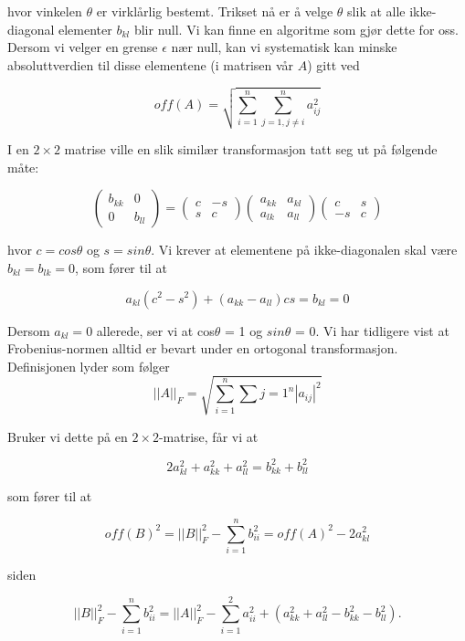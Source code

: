 \documentclass{article}
\begin{document}
hvor vinkelen $\theta$ er virklårlig bestemt. Trikset nå er å velge $\theta$ slik at alle ikke-diagonal elementer $b_{kl}$ blir null. Vi kan finne en algoritme som gjør dette for oss. Dersom vi velger en grense $\epsilon$ nær null, kan vi systematisk kan minske absoluttverdien til disse elementene (i matrisen vår $A$) gitt ved

\[off(A) = \sqrt{\sum_{i=1}^n \sum_{j=1, j\neq i}^n a_{ij}^2 } \]

I en $2 \times 2$ matrise ville en slik similær transformasjon tatt seg ut på følgende måte: 

\[\begin{pmatrix} 
b_{kk} &0 \\ 
0& b_{ll} \end{pmatrix} =
 \begin{pmatrix} 
 c & -s\\ 
 s & c \end{pmatrix}
 \begin{pmatrix} 
 a_{kk} & a_{kl}\\
  a_{lk}& a_{ll} \end{pmatrix}
  \begin{pmatrix} 
  c & s\\ 
  -s &c \end{pmatrix}\]

hvor $c = cos\theta$ og $s = sin\theta$. Vi krever at elementene på ikke-diagonalen skal være $b_{kl} = b_{lk} = 0$, som fører til at

\[a_{kl}(c^2 - s^2) + (a_{kk} - a_{ll})cs = b_{kl} = 0 \]

Dersom $a_{kl} = 0$ allerede, ser vi at cos$\theta$ = 1 og $sin\theta$ = 0. Vi har tidligere vist at Frobenius-normen alltid er bevart under en ortogonal transformasjon. Definisjonen lyder som følger
\begin{equation}
|| A ||_F = \sqrt{\sum_{i=1}^n \sum{j=1}^n |a_{ij}|^2 }
\end{equation}

Bruker vi dette på en $2\times 2$-matrise, får vi at 

\[2a_{kl}^2 + a_{kk}^2 + a_{ll}^2 = b_{kk}^2 + b_{ll}^2 \]

som fører til at

\[off(B)^2 = || B ||_F^2 - \sum_{i=1}^n b_{ii}^2 = off(A)^2 - 2a_{kl}^2 \]

siden

\[ || B ||_F^2 - \sum_{i=1}^n b_{ii}^2 = || A ||_F^2 - \sum_{i=1}^2a_{ii}^2 + (a_{kk}^2 + a_{ll}^2 - b_{kk}^2 - b_{ll}^2).  \]
\end{document}
